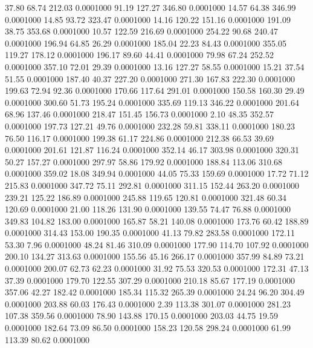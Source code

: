   37.80   68.74  212.03   0.0001000
  91.19  127.27  346.80   0.0001000
  14.57   64.38  346.99   0.0001000
  14.85   93.72  323.47   0.0001000
  14.16  120.22  151.16   0.0001000
 191.09   38.75  353.68   0.0001000
  10.57  122.59  216.69   0.0001000
 254.22   90.68  240.47   0.0001000
 196.94   64.85   26.29   0.0001000
 185.04   22.23   84.43   0.0001000
 355.05  119.27  178.12   0.0001000
 196.17   89.60   44.41   0.0001000
  79.98   67.24  252.52   0.0001000
 357.10   72.01   29.39   0.0001000
  13.16  127.27   58.55   0.0001000
  15.21   37.54   51.55   0.0001000
 187.40   40.37  227.20   0.0001000
 271.30  167.83  222.30   0.0001000
 199.63   72.94   92.36   0.0001000
 170.66  117.64  291.01   0.0001000
 150.58  160.30   29.49   0.0001000
 300.60   51.73  195.24   0.0001000
 335.69  119.13  346.22   0.0001000
 201.64   68.96  137.46   0.0001000
 218.47  151.45  156.73   0.0001000
   2.10   48.35  352.57   0.0001000
 197.73  127.21   49.76   0.0001000
 232.28   59.81  338.11   0.0001000
 180.23   76.50  116.17   0.0001000
 199.38   61.17  224.86   0.0001000
 212.38   66.53   39.69   0.0001000
 201.61  121.87  116.24   0.0001000
 352.14   46.17  303.98   0.0001000
 320.31   50.27  157.27   0.0001000
 297.97   58.86  179.92   0.0001000
 188.84  113.06  310.68   0.0001000
 359.02   18.08  349.94   0.0001000
  44.05   75.33  159.69   0.0001000
  17.72   71.12  215.83   0.0001000
 347.72   75.11  292.81   0.0001000
 311.15  152.44  263.20   0.0001000
 239.21  125.22  186.89   0.0001000
 245.88  119.65  120.81   0.0001000
 321.48   60.34  120.69   0.0001000
  21.00  118.26  131.90   0.0001000
 139.55   74.47   76.88   0.0001000
 349.83  104.82  183.00   0.0001000
 165.87   58.21  140.08   0.0001000
 173.76   60.42  188.89   0.0001000
 314.43  153.00  190.35   0.0001000
  41.13   79.82  283.58   0.0001000
 172.11   53.30    7.96   0.0001000
  48.24   81.46  310.09   0.0001000
 177.90  114.70  107.92   0.0001000
 200.10  134.27  313.63   0.0001000
 155.56   45.16  266.17   0.0001000
 357.99   84.89   73.21   0.0001000
 200.07   62.73   62.23   0.0001000
  31.92   75.53  320.53   0.0001000
 172.31   47.13   37.39   0.0001000
 179.70  122.55  307.29   0.0001000
 210.18   85.67  177.19   0.0001000
 357.06   42.27  182.42   0.0001000
 185.34  115.32  265.39   0.0001000
  24.24   96.20  304.49   0.0001000
 203.88   60.03  176.43   0.0001000
   2.39  113.38  301.07   0.0001000
 281.23  107.38  359.56   0.0001000
  78.90  143.88  170.15   0.0001000
 203.03   44.75   19.59   0.0001000
 182.64   73.09   86.50   0.0001000
 158.23  120.58  298.24   0.0001000
  61.99  113.39   80.62   0.0001000
